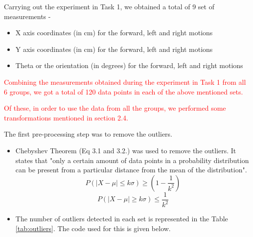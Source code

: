     {
    \begin{itemize}
        \item Carrying out the experiment in Task 1, we obtained a total of 9 set of measurements -
        \begin{itemize}
            \item X axis coordinates (in cm) for the forward, left and right motions
            \item Y axis coordinates (in cm) for the forward, left and right motions
            \item Theta or the orientation (in degrees) for the forward, left and right motions
        \end{itemize}
        \item \textcolor{red}{Combining the measurements obtained during the experiment in Task 1 from all 6 groups, we got a total of 120 data points in each of the above mentioned sets. 
        \item Of these, in order to use the data from all the groups, we performed some transformations mentioned in section 2.4.}
        \item The first pre-processing step was to remove the outliers. 
        \begin{itemize}
            \item Chebyshev Theorem (Eq 3.1 and 3.2.) was used to remove the outliers. It states that "only a certain amount of data points in a probability distribution can be present from a particular distance from the mean of the distribution".
             \begin{equation}
                P(\mid X - \mu \mid \leq k \sigma) \geq (1 - \frac{1}{k^2})
            \end{equation}
            \begin{equation}
                P(\mid X - \mu \mid \geq k \sigma) \leq \frac{1}{k^2}
            \end{equation}
            \item The number of outliers detected in each set is represented in the Table \ref{tab:outliers}. The code used for this is given below.
            \begin{table}[]
                \centering
\end{table}
\end{itemize}
\end{itemize}}
